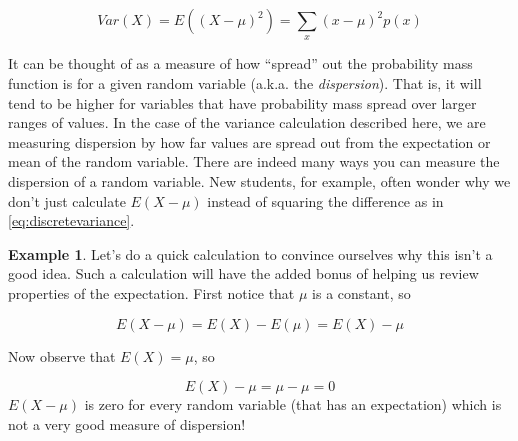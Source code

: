 \documentclass[
]{book}
\theoremstyle{definition}
\theoremstyle{definition}
\newtheorem{example}{Example}[chapter]
\theoremstyle{definition}
\theoremstyle{definition}
\theoremstyle{remark}
\begin{document}
\[
Var(X) = E((X-\mu)^2) = \sum_{x}^{} (x - \mu)^2p(x)
\label{eq:discretevariance}
\]

It can be thought of as a measure of how ``spread'' out the probability mass function is for a given random variable (a.k.a. the \emph{dispersion}). That is, it will tend to be higher for variables that have probability mass spread over larger ranges of values. In the case of the variance calculation described here, we are measuring dispersion by how far values are spread out from the expectation or mean of the random variable. There are indeed many ways you can measure the dispersion of a random variable. New students, for example, often wonder why we don't just calculate \(E(X - \mu)\) instead of squaring the difference as in \eqref{eq:discretevariance}.

\begin{example}
Let's do a quick calculation to convince ourselves why this isn't a good idea. Such a calculation will have the added bonus of helping us review properties of the expectation. First notice that \(\mu\) is a constant, so

\[
E(X-\mu) = E(X) - E(\mu) = E(X) - \mu
\]

Now observe that \(E(X) = \mu\), so

\[
E(X) - \mu = \mu - \mu = 0
\]
\(E(X - \mu)\) is zero for every random variable (that has an expectation) which is not a very good measure of dispersion!
\end{example}
\end{document}
